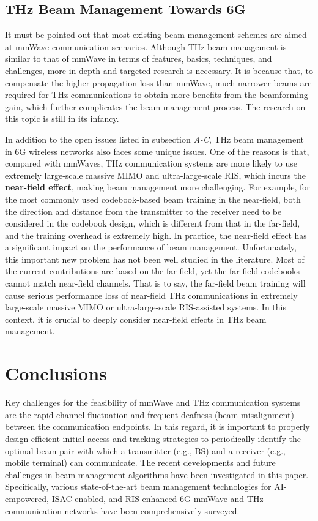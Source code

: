 \documentclass[journal,comsoc]{IEEEtran}
\begin{document}
\subsection{THz Beam Management Towards 6G}
It must be pointed out that most existing beam management schemes are aimed at mmWave communication scenarios. Although THz beam management is similar to that of mmWave in terms of features, basics, techniques, and challenges, more in-depth and targeted research is necessary. It is because that, to compensate the higher propagation loss than mmWave, much narrower beams are required for THz communications to obtain more benefits from the beamforming gain, which further complicates the beam management process. The research on this topic is still in its infancy.

In addition to the open issues listed in subsection \emph{A-C}, THz beam management in 6G wireless networks also faces some unique issues. One of the reasons is that, compared with mmWaves, THz communication systems are more likely to use extremely large-scale massive MIMO and ultra-large-scale RIS, which incurs the {\bf{near-field effect}}, making beam management more challenging. For example, for the most commonly used codebook-based beam training in the near-field, both the direction and distance from the transmitter to the receiver need to be considered in the codebook design, which is different from that in the far-field, and the training overhead is extremely high. In practice, the near-field effect has a significant impact on the performance of beam management. Unfortunately, this important new problem has not been well studied in the literature. Most of the current contributions are based on the far-field, yet the far-field codebooks cannot match near-field channels. That is to say, the far-field beam training will cause serious performance loss of near-field THz communications in extremely large-scale massive MIMO or ultra-large-scale RIS-assisted systems. In this context, it is crucial to deeply consider near-field effects in THz beam management.



\section{Conclusions}
Key challenges for the feasibility of mmWave and THz communication systems are the rapid channel fluctuation and frequent deafness (beam misalignment) between the communication endpoints. In this regard, it is important to properly design efficient initial access and tracking strategies to periodically identify the optimal beam pair with which a transmitter (e.g., BS) and a receiver (e.g., mobile terminal) can communicate. The recent developments and future challenges in beam management algorithms have been investigated in this paper. Specifically, various state-of-the-art beam management technologies for AI-empowered, ISAC-enabled, and RIS-enhanced 6G mmWave and THz communication networks have been comprehensively surveyed.
\end{document}
